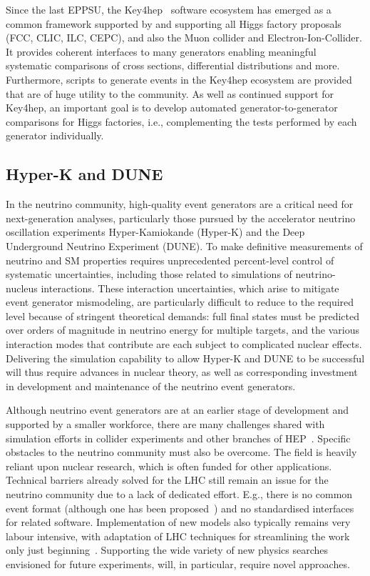 \documentclass[10pt,a4paper]{article}
\begin{document}
Since the last EPPSU, the Key4hep~\cite{Ganis2022} software ecosystem has emerged as a
common framework supported by and supporting all Higgs factory proposals
(FCC, CLIC, ILC, CEPC), and also the Muon collider and
Electron-Ion-Collider. It provides coherent interfaces to many
generators enabling meaningful systematic comparisons of cross
sections, differential distributions and more. Furthermore, scripts to
generate events in the Key4hep ecosystem are provided that are of huge
utility to the community. As well as continued support for Key4hep, an
important goal is to develop automated generator-to-generator
comparisons for Higgs factories, i.e., complementing the tests performed
by each generator individually.

\subsection{Hyper-K and DUNE}\label{hyper-k-and-dune}

In the neutrino community, high-quality event generators are a critical need for
next-generation analyses, particularly those pursued by the accelerator neutrino
oscillation experiments Hyper-Kamiokande (Hyper-K) and the Deep Underground
Neutrino Experiment (DUNE). To make definitive measurements of neutrino and SM
properties requires unprecedented percent-level control of systematic
uncertainties, including those related to simulations of neutrino-nucleus
interactions. These interaction uncertainties, which arise to mitigate event
generator mismodeling, are particularly difficult to reduce to the required
level because of stringent theoretical demands: full final states must be
predicted over orders of magnitude in neutrino energy for multiple targets, and
the various interaction modes that contribute are each subject to complicated
nuclear effects. Delivering the simulation capability to allow Hyper-K and DUNE
to be successful will thus require advances in nuclear theory, as well as
corresponding investment in development and maintenance of the neutrino event
generators.

Although neutrino event generators are at an earlier stage of development and
supported by a smaller workforce, there are many challenges shared with
simulation efforts in collider experiments and other branches of
HEP~\cite{2203.11110}. Specific obstacles to the neutrino community must also be
overcome. The field is heavily reliant upon nuclear research, which is often
funded for other applications. Technical barriers already solved for the LHC
still remain an issue for the neutrino community due to a lack of dedicated
effort. E.g., there is no common event format (although one has 
been proposed~\cite{2310.13211}) and no standardised interfaces for related
software. Implementation of new models also typically remains very labour
intensive, with adaptation of LHC techniques for streamlining the work only just
beginning~\cite{https://doi.org/10.1103/PhysRevD.105.096006}. Supporting the
wide variety of new physics searches envisioned for future experiments, will, in
particular, require novel approaches.
\end{document}
